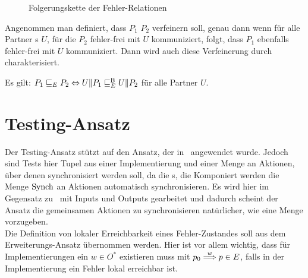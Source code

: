 \begin{figure}[h!tbp]
  \begin{center}
    \caption{Folgerungskette der Fehler-Relationen}
  \label{KommFolgerungskette}
  \end{center}
\end{figure}

Angenommen man definiert, dass $P_1$ $P_2$ verfeinern soll, genau dann wenn für
alle Partner \MEIO{}s $U$, für die $P_2$ fehler-frei mit $U$ kommuniziert,
folgt, dass $P_1$ ebenfalls fehler-frei mit $U$ kommuniziert. Dann wird auch
diese Verfeinerung durch \ERel{} charakterisiert.

\begin{Kor}
  Es gilt: $P_1 \sqsubseteq  _E P_2\Leftrightarrow U\|P_1 \sqsubseteq  _E^\mathrm{B} U\|P_2$ für alle Partner
  $U$.
\end{Kor}

\section{Testing-Ansatz}

Der Testing-Ansatz stützt auf den Ansatz, der in~\cite{Vogler2015FailSem}
angewendet wurde. Jedoch sind Tests hier Tupel aus einer Implementierung und
einer Menge an Aktionen, über denen synchronisiert werden soll, da die
\MEIO{}s, die Komponiert werden die Menge $\mathrm{Synch}$ an Aktionen automatisch
synchronisieren. Es wird hier im Gegensatz zu~\cite{Vogler2015FailSem} mit
Inputs und Outputs gearbeitet und dadurch scheint der Ansatz die gemeinsamen
Aktionen zu synchronisieren natürlicher, wie eine Menge vorzugeben.\\
Die Definition von lokaler Erreichbarkeit eines Fehler-Zustandes soll aus dem
Erweiterungs-Ansatz übernommen werden. Hier ist vor allem wichtig, dass für
Implementierungen ein $w\in O^*$ existieren muss mit $p_0\weakmust[w] p\in E$,
falls in der Implementierung ein Fehler lokal erreichbar ist.

